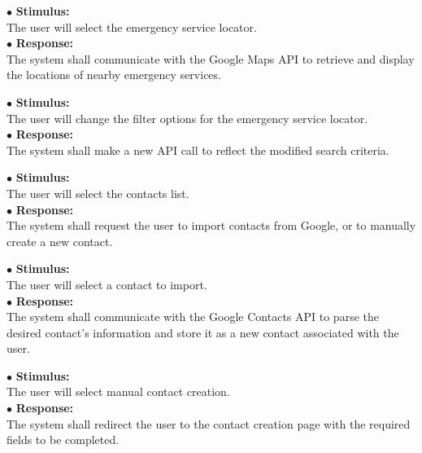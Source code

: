\documentclass{scrreprt}
\begin{document}
\vspace{4mm}
	\hspace{-4.75mm} $\bullet$ \textbf{Stimulus:} \\ \hspace{5mm} The user will select the emergency service locator.\\
	$\bullet$ \textbf{Response:} \\ \hspace{5mm} The system shall communicate with the Google Maps API to retrieve and display the locations of nearby emergency services.

\vspace{4mm}
	\hspace{-4.75mm} $\bullet$ \textbf{Stimulus:} \\ \hspace{5mm} The user will change the filter options for the emergency service locator.\\
	$\bullet$ \textbf{Response:} \\ \hspace{5mm} The system shall make a new API call to reflect the modified search criteria.

\vspace{4mm}
	\hspace{-4.75mm} $\bullet$ \textbf{Stimulus:} \\ \hspace{5mm} The user will select the contacts list.\\
	$\bullet$ \textbf{Response:} \\ \hspace{5mm} The system shall request the user to import contacts from Google, or to manually create a new contact.

\vspace{4mm}
	\hspace{-4.75mm} $\bullet$ \textbf{Stimulus:} \\ \hspace{5mm} The user will select a contact to import.\\
	$\bullet$ \textbf{Response:} \\ \hspace{5mm} The system shall communicate with the Google Contacts API to parse the desired contact's information and store it as a new contact associated with the user.

\vspace{4mm}
	\hspace{-4.75mm} $\bullet$ \textbf{Stimulus:} \\ \hspace{5mm} The user will select manual contact creation.\\
	$\bullet$ \textbf{Response:} \\ \hspace{5mm} The system shall redirect the user to the contact creation page with the required fields to be completed.
\end{document}
